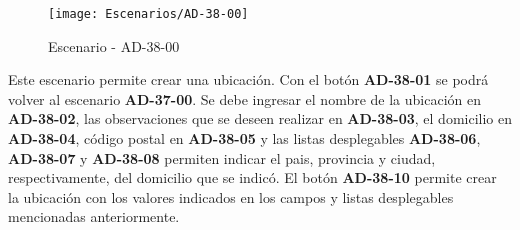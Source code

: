 \begin{figure}[H]
\centering
\texttt{[image: Escenarios/AD-38-00]}
\caption{Escenario - AD-38-00}
\label{fig:AD-38-00}
\end{figure}

Este escenario permite crear una ubicación. Con el botón \textbf{AD-38-01} se podrá volver al escenario \textbf{AD-37-00}. Se debe ingresar el nombre de la ubicación en \textbf{AD-38-02}, las observaciones que se deseen realizar en \textbf{AD-38-03}, el domicilio en \textbf{AD-38-04}, código postal en \textbf{AD-38-05} y las listas desplegables \textbf{AD-38-06}, \textbf{AD-38-07} y \textbf{AD-38-08}  permiten indicar el pais, provincia y ciudad, respectivamente, del domicilio que se indicó. El botón \textbf{AD-38-10} permite crear la ubicación con los valores indicados en los campos y listas desplegables mencionadas anteriormente.
\clearpage
